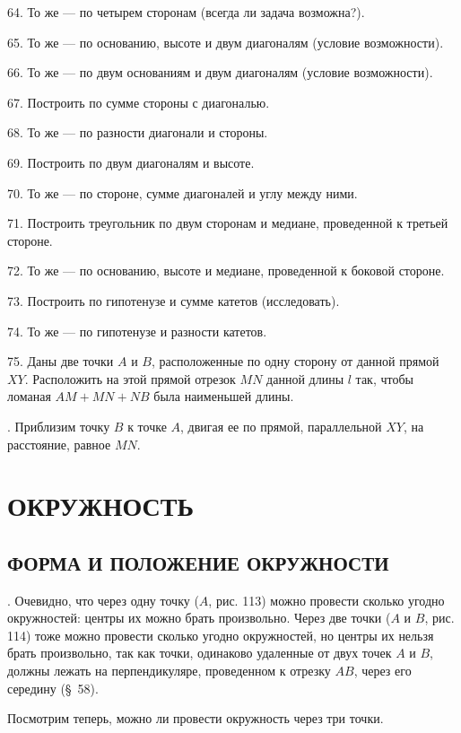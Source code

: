 \documentclass[oneside]{book}
\begin{document}
64.
То же — по четырем сторонам (всегда ли задача возможна?).

65.
То же — по основанию, высоте и двум диагоналям (условие возможности).

66.
То же — по двум основаниям и двум диагоналям (условие возможности).

67.
Построить  по сумме стороны с диагональю.

68.
То же — по разности диагонали и стороны.

69.
Построить  по двум диагоналям и высоте.

70.
То же — по стороне, сумме диагоналей и углу между ними.

71.
Построить треугольник по двум сторонам и медиане, проведенной к третьей стороне.

72.
То же — по основанию, высоте и медиане, проведенной к боковой стороне.

73.
Построить  по гипотенузе и сумме катетов (исследовать).

74.
То же — по гипотенузе и разности катетов.

75.
Даны две точки $A$ и $B$, расположенные по одну сторону от данной прямой $XY$.
Расположить на этой прямой отрезок $MN$ данной длины $l$ так, чтобы ломаная $AM+MN+NB$ была наименьшей длины.

.
Приблизим точку $B$ к точке $A$, двигая ее по прямой, параллельной $XY$, на расстояние, равное $MN$.



\chapter{ОКРУЖНОСТЬ}

\section{ФОРМА И ПОЛОЖЕНИЕ ОКРУЖНОСТИ}

.
Очевидно, что через одну точку ($A$, рис. 113) можно провести сколько угодно окружностей:
центры их можно брать произвольно.
Через две точки ($A$ и $B$, рис. 114) тоже можно провести сколько угодно окружностей, но центры их нельзя брать произвольно, так как точки, одинаково удаленные от двух точек $A$ и $B$, должны лежать на перпендикуляре, проведенном к отрезку $AB$, через его середину (§~58).

Посмотрим теперь, можно ли провести окружность через три точки.
\end{document}
